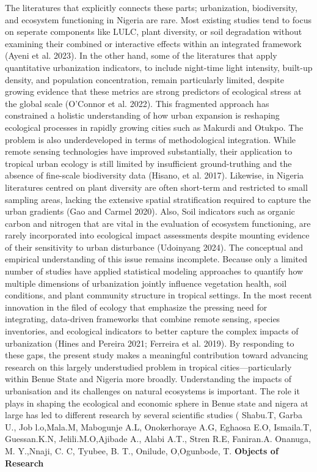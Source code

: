 The literatures that explicitly connects these parts; urbanization, biodiversity, and ecosystem functioning in Nigeria are rare. Most existing studies tend to focus on seperate components like LULC, plant diversity, or soil degradation without examining their combined or interactive effects within an integrated framework (Ayeni et al. 2023). In the other hand, some of the literatures that apply quantitative urbanization indicators, to include night-time light intensity, built-up density, and population concentration, remain particularly limited, despite growing evidence that these metrics are strong predictors of ecological stress at the global scale (O'Connor et al. 2022). This fragmented approach has constrained a holistic understanding of how urban expansion is reshaping ecological processes in rapidly growing cities such as Makurdi and Otukpo.
The problem is also underdeveloped in terms of methodological integration. While remote sensing technologies have improved substantially, their application to tropical urban ecology is still limited by insufficient ground-truthing and the absence of fine-scale biodiversity data (Hisano, et al. 2017). Likewise, in Nigeria literatures centred on plant diversity are often short-term and restricted to small sampling areas, lacking the extensive spatial stratification required to capture the urban gradients (Gao and Carmel 2020). Also, Soil indicators such as organic carbon and nitrogen that are vital in the evaluation of ecosystem functioning, are rarely incorporated into ecological impact assessments despite mounting evidence of their sensitivity to urban disturbance (Udoinyang 2024).
The conceptual and empirical understanding of this issue remains incomplete. Because only a limited number of studies have applied statistical modeling approaches to quantify how multiple dimensions of urbanization jointly influence vegetation health, soil conditions, and plant community structure in tropical settings. In the most recent innovation in the filed of ecology that emphasize the pressing need for integrating, data-driven frameworks that combine remote sensing, species inventories, and ecological indicators to better capture the complex impacts of urbanization (Hines and Pereira 2021; Ferreira et al. 2019). By responding to these gaps, the present study makes a meaningful contribution toward advancing research on this largely understudied problem in tropical cities---particularly within Benue State and Nigeria more broadly.
Understanding the impacts of urbanisation and its challenges on natural ecosystems is important. The role it plays in shaping the ecological and economic sphere in Benue state and nigera at large has led to different research by several scientific studies ( Shabu.T, Garba U., Job l.o,Mala.M, Mabogunje A.L, Onokerhoraye A.G, Eghaosa E.O, Ismaila.T, Guessan.K.N, Jelili.M.O,Ajibade A., Alabi A.T., Stren R.E, Faniran.A. Onanuga, M. Y.,Nnaji, C. C, Tyubee, B. T., Onilude, O,Ogunbode, T.
{}\textbf{Objects of Research}


